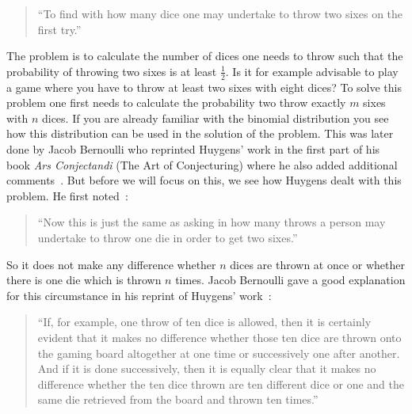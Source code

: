 
\begin{quote}
  ``To find with how many dice one may undertake to throw two sixes on the first try.''
\end{quote}

The problem is to calculate the number of dices one needs to throw such that the probability of throwing two sixes is at least $\tfrac 12$. Is it for example advisable to play a game where you have to throw at least two sixes with eight dices? To solve this problem one first needs to calculate the probability two throw exactly $m$ sixes with $n$ dices. If you are already familiar with the binomial distribution you see how this distribution can be used in the solution of the problem. This was later done by Jacob Bernoulli who reprinted Huygens' work in the first part of his book \emph{Ars Conjectandi} (The Art of Conjecturing) where he also added additional comments~\cite[p. 63]{bernoulli}. But before we will focus on this, we see how Huygens dealt with this problem. He first noted~\cite[p. 163]{bernoulli}:

\begin{quote}
  ``Now this is just the same as asking in how many throws a person may undertake to throw one die in order to get two sixes.''
\end{quote}

So it does not make any difference whether $n$ dices are thrown at once or whether there is one die which is thrown $n$ times. Jacob Bernoulli gave a good explanation for this circumstance in his reprint of Huygens' work~\cite[p. 163]{bernoulli}:

\begin{quote}
  ``If, for example, one throw of ten dice is allowed, then it is certainly evident that it makes no difference whether those ten dice are thrown onto the gaming board altogether at one time or successively one after another. And if it is done successively, then it is equally clear that it makes no difference whether the ten dice thrown are ten different dice or one and the same die retrieved from the board and thrown ten times.''
\end{quote}

